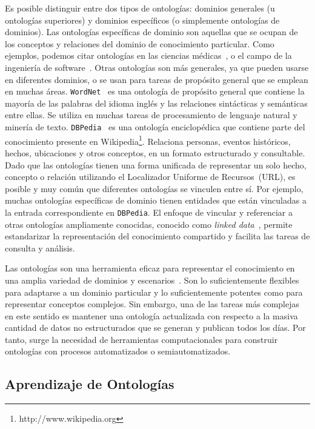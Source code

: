 Es posible distinguir entre dos tipos de ontologías: dominios generales (u ontologías superiores) y dominios específicos (o simplemente ontologías de dominios). Las ontologías específicas de dominio son aquellas que se ocupan de los conceptos y relaciones del dominio de conocimiento particular.
Como ejemplos, podemos citar ontologías en las ciencias médicas~\cite{rector2003opengalen, gene2004gene}, o el campo de la ingeniería de software~\cite{4641930}.
Otras ontologías son más generales, ya que pueden usarse en diferentes dominios, o se usan para tareas de propósito general que se emplean en muchas áreas. \texttt{WordNet}~\cite{miller1995wordnet} es una ontología de propósito general que contiene la mayoría de las palabras del idioma inglés y las relaciones sintácticas y semánticas entre ellas.
Se utiliza en muchas tareas de procesamiento de lenguaje natural y minería de texto.
\texttt{DBPedia}~\cite{mendes2012dbpedia} es una ontología enciclopédica que contiene parte del conocimiento presente en Wikipedia\footnote{http://www.wikipedia.org}.
Relaciona personas, eventos históricos, hechos, ubicaciones y otros conceptos, en un formato estructurado y consultable. Dado que las ontologías tienen una forma unificada de representar un solo hecho, concepto o relación utilizando el Localizador Uniforme de Recursos~(URL), es posible y muy común que diferentes ontologías se vinculen entre sí.
Por ejemplo, muchas ontologías específicas de dominio tienen entidades que están vinculadas a la entrada correspondiente en \texttt{DBPedia}.
El enfoque de vincular y referenciar a otras ontologías ampliamente conocidas, conocido como \textit{linked data}~\cite{bizer2009linked}, permite estandarizar la representación del conocimiento compartido y facilita las tareas de consulta y análisis.

Las ontologías son una herramienta eficaz para representar el conocimiento en una amplia variedad de dominios y escenarios~\cite{staab2010handbook}.
Son lo suficientemente flexibles para adaptarse a un dominio particular y lo suficientemente potentes como para representar conceptos complejos.
Sin embargo, una de las tareas más complejas en este sentido es mantener una ontología actualizada con respecto a la masiva cantidad de datos no estructurados que se generan y publican todos los días.
Por tanto, surge la necesidad de herramientas computacionales para construir ontologías con procesos automatizados o semiautomatizados.

\subsection{Aprendizaje de Ontologías}

